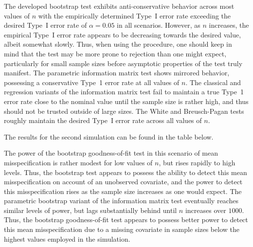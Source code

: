\documentclass[submit]{smj}
\begin{document}
The developed bootstrap test exhibits anti-conservative behavior across most values of $n$ with the empirically determined Type~I error rate exceeding the desired Type~I error rate
of $\alpha = 0.05$ in all scenarios. However, as $n$ increases, the empirical Type~I error rate appears to be decreasing towards the desired value, albeit somewhat slowly. Thus, when
using the procedure, one should keep in mind that the test may be more prone to
rejection than one might expect, particularly for small sample sizes before asymptotic properties of the test truly manifest. The parametric information matrix test shows mirrored behavior,
possessing a conservative Type~1 error rate at all values of $n$. The classical and regression variants of the information matrix test fail to maintain a true Type~1 error rate close
to the nominal value until the sample size is rather high, and thus should not be trusted outside of large sizes. The White and Breusch-Pagan tests roughly maintain the desired Type~I error rate across all values of $n$.

The results for the second simulation can be found in the table below.

\begin{table}[H]
	\centering
	\small\addtolength{\tabcolsep}{-3pt}
	\setlength\extrarowheight{-3pt}
	{
	}
	\end{table}

The power of the bootstrap goodness-of-fit test in this scenario of mean misspecification is rather modest for low values of $n$, but rises rapidly to high levels. Thus, the bootstrap test appears to possess the
ability to detect this mean misspecification on account of an unobserved covariate, and the power to detect this misspecification rises as the sample size increases as one would expect.
The parametric bootstrap variant of the information matrix test eventually reaches similar levels of power, but lags substantially behind until $n$ increases over $1000$. Thus, the bootstrap
goodness-of-fit test appears to possess better power to detect this mean misspecification due to a missing covariate in sample sizes below the highest values employed in the simulation.
\end{document}
